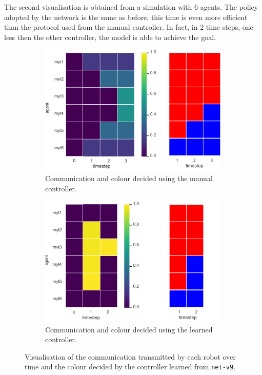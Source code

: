\bigskip
The second visualisation is obtained from a simulation with 6 agents. 
The policy adopted by the network is the same as before, this time is even more 
efficient than the protocol used from the manual controller. In fact, in 2 time 
steps, one less then the other controller, the model is able to achieve the goal.
\begin{figure}[!htb]
	\begin{subfigure}[h]{\textwidth}
		\centering
		\includegraphics[width=.55\textwidth]{contents/images/net-v9/net-v9-manual-1}
		\caption{Communication and colour decided using the manual controller.}
	\end{subfigure}
	\hspace*{\fill}%
	\vspace*{8pt}%
	\hspace*{\fill}%
	\begin{subfigure}[h]{\textwidth}
		\centering			
		\includegraphics[width=.55\textwidth]{contents/images/net-v9/net-v9-learned-1}
		\caption{Communication and colour decided using the learned controller.}
	\end{subfigure}
	\caption[Evaluation of the communication learned by 
	\texttt{net-v9}.]{Visualisation of the communication transmitted by each 
		robot over time and the colour decided by the controller learned from 
		\texttt{net-v9}.}	
	\label{fig:net-v9commcolour2}
\end{figure}

